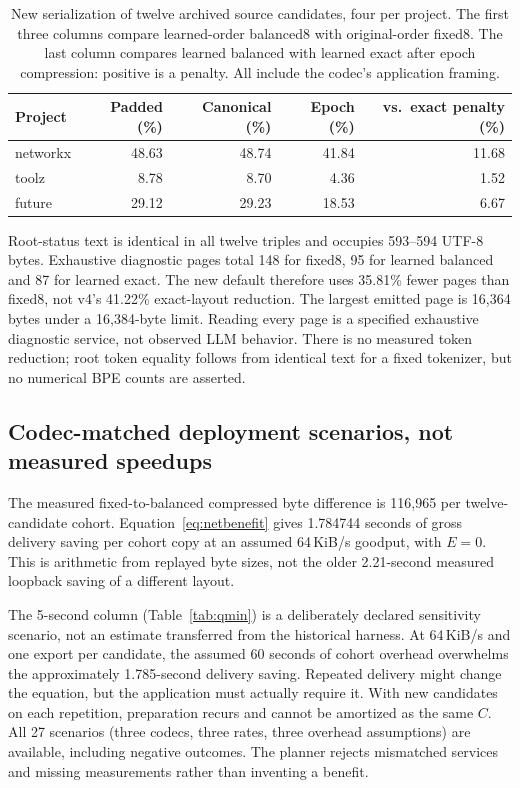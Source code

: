 \begin{table}[t]\centering\small
\caption{New serialization of twelve archived source candidates, four per project. The first three columns compare learned-order balanced8 with original-order fixed8. The last column compares learned balanced with learned exact after epoch compression: positive is a penalty. All include the codec's application framing.}\label{tab:replay}
\begin{tabularx}{\linewidth}{@{}l r r r r@{}}\toprule
Project & Padded (\%) & Canonical (\%) & Epoch (\%) & vs.\ exact penalty (\%)\\\midrule
networkx & 48.63 & 48.74 & 41.84 & 11.68\\
toolz & 8.78 & 8.70 & 4.36 & 1.52\\
future & 29.12 & 29.23 & 18.53 & 6.67\\
\bottomrule\end{tabularx}\end{table}

Root-status text is identical in all twelve triples and occupies 593--594 UTF-8
bytes. Exhaustive diagnostic pages total 148 for fixed8, 95 for learned balanced
and 87 for learned exact. The new default therefore uses 35.81\% fewer pages than
fixed8, not v4's 41.22\% exact-layout reduction. The largest emitted page is
16{,}364 bytes under a 16{,}384-byte limit. Reading every page is a specified
exhaustive diagnostic service, not observed LLM behavior. There is no measured
token reduction; root token equality follows from identical text for a fixed
tokenizer, but no numerical BPE counts are asserted.

\subsection{Codec-matched deployment scenarios, not measured speedups}\label{sec:scenarios}
The measured fixed-to-balanced compressed byte difference is 116{,}965 per
twelve-candidate cohort. Equation~\eqref{eq:netbenefit} gives 1.784744 seconds of
gross delivery saving per cohort copy at an assumed 64\,KiB/s goodput, with
$E=0$. This is arithmetic from replayed byte sizes, not the older 2.21-second
measured loopback saving of a different layout.

The 5-second column (Table~\ref{tab:qmin}) is a deliberately declared sensitivity
scenario, not an estimate transferred from the historical harness. At 64\,KiB/s
and one export per candidate, the assumed 60 seconds of cohort overhead
overwhelms the approximately 1.785-second delivery saving. Repeated delivery
might change the equation, but the application must actually require it. With new
candidates on each repetition, preparation recurs and cannot be amortized as the
same $C$. All 27 scenarios (three codecs, three rates, three overhead assumptions)
are available, including negative outcomes. The planner rejects mismatched
services and missing measurements rather than inventing a benefit.

